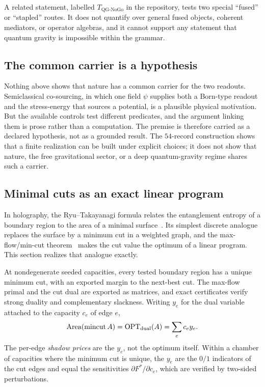 A related statement, labelled \(T_{\mathrm{QG\text{-}NoGo}}\) in the repository, tests two special ``fused'' or
``stapled'' routes. It does not quantify over general fused objects, coherent mediators, or operator algebras, and it
cannot support any statement that quantum gravity is impossible within the grammar.



\subsection{The common carrier is a hypothesis}\label{grounding-the-premise}

Nothing above shows that nature has a common carrier for the two readouts. Semiclassical co-sourcing, in which one
field \(\psi\) supplies both a Born-type readout and the stress-energy that sources a potential, is a plausible
physical motivation. But the available controls test different predicates, and the argument linking them is prose
rather than a computation. The premise is therefore carried as a declared hypothesis, not as a grounded result. The
\(54\)-record construction shows that a finite realization can be built under explicit choices; it does not show that
nature, the free gravitational sector, or a deep quantum-gravity regime shares such a carrier.

\subsection{Minimal cuts as an exact linear program}\label{recognition-ryutakayanagi-as-ledgershadow-price-duality}

In holography, the Ryu--Takayanagi formula relates the entanglement entropy of a boundary region to the area of a
minimal surface~\citep{RyuTakayanagi2006,Maldacena1998}. Its simplest discrete analogue replaces the surface by a
minimum cut in a weighted graph, and the max-flow/min-cut theorem~\citep{FordFulkerson1956} makes the cut value the
optimum of a linear program. This section realizes that analogue exactly.

At nondegenerate seeded capacities, every tested boundary region has a unique minimum cut, with an exported margin to
the next-best cut. The max-flow primal and the cut dual are exported as matrices, and exact certificates verify strong
duality and complementary slackness. Writing \(y_e\) for the dual variable attached to the capacity \(c_e\) of edge
\(e\),
\[
\operatorname{Area}(\operatorname{mincut}A)
=\operatorname{OPT}_{\rm dual}(A)
=\sum_e c_e y_e .
\]
The per-edge \emph{shadow prices} are the \(y_e\), not the optimum itself. Within a chamber of capacities where the
minimum cut is unique, the \(y_e\) are the \(0/1\) indicators of the cut edges and equal the sensitivities
\(\partial F^*/\partial c_e\), which are verified by two-sided perturbations.

